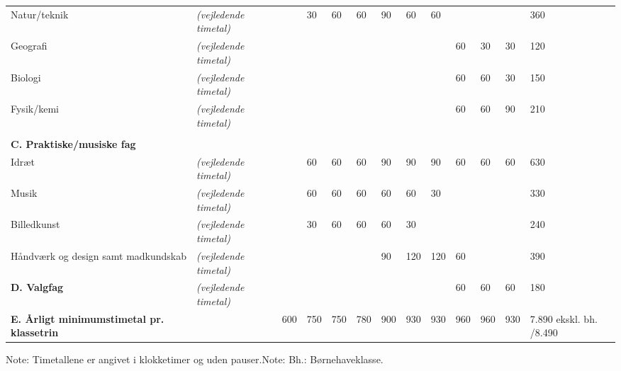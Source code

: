 \begin{table}[]
{\begin{tabular}{lllllllllllll}
			Natur/teknik                                               & \textit{(vejledende timetal)} &     & 30  & 60  & 60  & 90  & 60  & 60  &     &     &     & 360                     \\
			Geografi                                                   & \textit{(vejledende timetal)} &     &     &     &     &     &     &     & 60  & 30  & 30  & 120                     \\
			Biologi                                                    & \textit{(vejledende timetal)} &     &     &     &     &     &     &     & 60  & 60  & 30  & 150                     \\
			Fysik/kemi                                                 & \textit{(vejledende timetal)} &     &     &     &     &     &     &     & 60  & 60  & 90  & 210                     \\
			&                               &     &     &     &     &     &     &     &     &     &     &                         \\
			\textbf{C. Praktiske/musiske fag}                          &                               &     &     &     &     &     &     &     &     &     &     &                         \\
			Idræt                                                      & \textit{(vejledende timetal)} &     & 60  & 60  & 60  & 90  & 90  & 90  & 60  & 60  & 60  & 630                     \\
			Musik                                                      & \textit{(vejledende timetal)} &     & 60  & 60  & 60  & 60  & 60  & 30  &     &     &     & 330                     \\
			Billedkunst                                                & \textit{(vejledende timetal)} &     & 30  & 60  & 60  & 60  & 30  &     &     &     &     & 240                     \\
			Håndværk og design samt madkundskab                        & \textit{(vejledende timetal)} &     &     &     &     & 90  & 120 & 120 & 60  &     &     & 390                     \\
			\textbf{D. Valgfag}                                        & \textit{(vejledende timetal)} &     &     &     &     &     &     &     & 60  & 60  & 60  & 180                     \\
			\textbf{E. Årligt minimumstimetal pr. klassetrin}          &                               & 600 & 750 & 750 & 780 & 900 & 930 & 930 & 960 & 960 & 930 & 7.890 ekskl. bh. /8.490
		\end{tabular}
	}
\end{table}
Note: Timetallene er angivet i klokketimer og uden pauser.Note: Bh.: Børnehaveklasse.
\fi